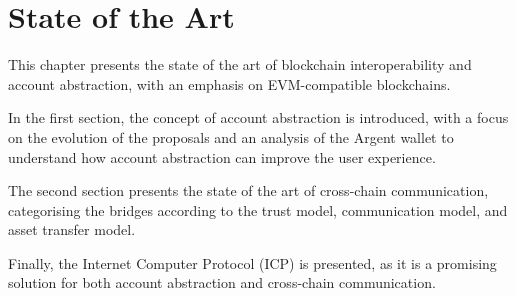 \chapter{State of the Art}
\label{chap:state_of_the_art}

This chapter presents the state of the art of blockchain interoperability and account abstraction, with an emphasis on EVM-compatible blockchains.\cite{evm} 

In the first section, the concept of account abstraction is introduced, with a focus on the evolution of the proposals and an analysis of the Argent wallet to understand how account abstraction can improve the user experience.

The second section presents the state of the art of cross-chain communication, categorising the bridges according to the trust model, communication model, and asset transfer model. 

Finally, the Internet Computer Protocol (ICP) is presented, as it is a promising solution for both account abstraction and cross-chain communication. 





